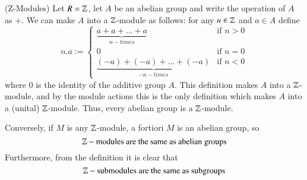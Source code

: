 \documentclass[12pt, a4paper, twoside, openright, titlepage]{book}
\begin{document}
\begin{eg}{(Z-Modules)}{}
    Let $R=\mathbb Z$, let $A$ be an abelian group and write the operation of $A$ as $+$. We can make $A$ into a $\mathbb Z$-module as follows: for any $n \in \mathbb Z$ and $a \in A$ define \begin{equation*}
        n.a := \left\{\begin{array}{lc} \underbrace{a+a+...+a}_{n-times} & \text{if } n > 0 \\ 0 & \text{if } n = 0 \\ \underbrace{(-a)+(-a)+...+(-a)}_{-n-times} & \text{if } n < 0
        \end{array}\right.
    \end{equation*}
    where $0$ is the identity of the additive group $A$. This definition makes $A$ into a $\mathbb Z$-module, and by the module actions this is the only definition which makes $A$ into a (unital) $\mathbb Z$-module. Thus, every abelian group is a $\mathbb Z$-module. 


    Conversely, if $M$ is any $\mathbb Z$-module, a fortiori $M$ is an abelian group, so \begin{equation*}
        \mathbb Z-\text{modules are the same as abelian groups}
    \end{equation*}
    Furthermore, from the definition it is clear that \begin{equation*}
        \mathbb Z-\text{submodules are the same as subgroups}
    \end{equation*}
\end{eg}
\end{document}
